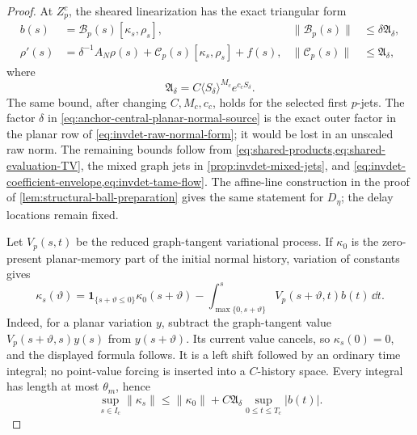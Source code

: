 \begin{proof}
At \(Z_p^c\), the sheared linearization has the exact triangular form
\begin{align}
 b(s)&=\mathscr B_p(s)[\kappa_s,\rho_s],
 &\|\mathscr B_p(s)\|&\le\delta\mathfrak A_\delta,
                                                        \label{eq:anchor-central-planar-normal-source}\\
 \rho'(s)&=\delta^{-1}A_N\rho(s)
       +\mathscr C_p(s)[\kappa_s,\rho_s]+f(s),
 &\|\mathscr C_p(s)\|&\le\mathfrak A_\delta,       \label{eq:anchor-central-fast-normal-equation}
\end{align}
where
\begin{equation}
 \mathfrak A_\delta
 =C\langle S_\delta\rangle^{M_c}e^{c_cS_\delta}.    \label{eq:anchor-central-ambient-tame-factor}
\end{equation}
The same bound, after changing \(C,M_c,c_c\), holds for the selected first
\(p\)-jets.  The factor \(\delta\) in
\cref{eq:anchor-central-planar-normal-source} is the exact outer factor in
the planar row of \cref{eq:invdet-raw-normal-form}; it would be lost in an
unscaled raw norm.  The remaining bounds follow from
\cref{eq:shared-products,eq:shared-evaluation-TV}, the mixed graph jets in
\cref{prop:invdet-mixed-jets}, and
\cref{eq:invdet-coefficient-envelope,eq:invdet-tame-flow}.  The affine-line
construction in the proof of \cref{lem:structural-ball-preparation} gives
the same statement for \(D_\eta\); the delay locations remain fixed.

Let \(V_p(s,t)\) be the reduced graph-tangent variational process.  If
\(\kappa_0\) is the zero-present planar-memory part of the initial normal
history, variation of constants gives
\begin{equation}
 \kappa_s(\vartheta)
 =\mathbf1_{\{s+\vartheta\le0\}}\kappa_0(s+\vartheta)
 -\int_{\max\{0,s+\vartheta\}}^s
       V_p(s+\vartheta,t)b(t)\,\dd t.              \label{eq:anchor-central-free-shift}
\end{equation}
Indeed, for a planar variation \(y\), subtract the graph-tangent value
\(V_p(s+\vartheta,s)y(s)\) from \(y(s+\vartheta)\).  Its current value
cancels, so \(\kappa_s(0)=0\), and the displayed formula follows.  It is a
left shift followed by an ordinary time integral; no point-value forcing is
inserted into a \(C\)-history space.  Every integral has length at most
\(\theta_m\), hence
\begin{equation}
 \sup_{s\in I_c}\|\kappa_s\|
 \le \|\kappa_0\|
   +C\mathfrak A_\delta\sup_{0\le t\le T_c}|b(t)|. \label{eq:anchor-central-shift-bound}
\end{equation}


\end{proof}
